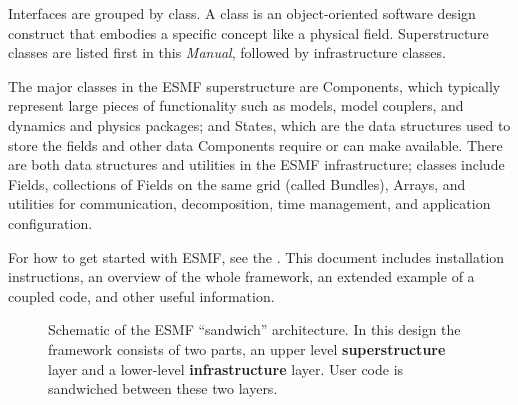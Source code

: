 Interfaces are grouped by class.  A class is an object-oriented software 
design construct that embodies 
a specific concept like a physical field.  Superstructure classes 
are listed first in this {\it Manual}, followed by infrastructure 
classes.

The major classes in the ESMF superstructure are Components, which 
typically represent
large pieces of functionality such as models, model couplers, and 
dynamics and physics packages; and States, which are the data structures
used to store the fields and other data Components require or can 
make available.  There are both data structures and utilities in the ESMF 
infrastructure; classes include Fields, collections of Fields on the 
same grid (called Bundles), Arrays, and utilities for communication,
decomposition, time management, and application configuration.

For how to get started with ESMF, see the 
.  This document includes installation instructions, an
overview of the whole framework, an extended example of a coupled code, 
and other useful information. 

\begin{center}
\begin{figure}
\caption{Schematic of the ESMF ``sandwich'' architecture. In this design the framework consists of two parts, an upper level
{\bf superstructure} layer and a lower-level {\bf infrastructure} layer. User code is sandwiched between these two layers.}
\label{fig:TheESMFwich}
\end{figure}
\end{center}

